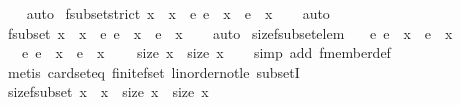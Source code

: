 \begin{isabellebody}
%
\isadelimproof
\ \ %
\endisadelimproof
%
\isatagproof
{}\isamarkupfalse%
\ auto%
\endisatagproof
{\isafoldproof}%
%
\isadelimproof
\isanewline
%
\endisadelimproof
\isanewline
{}\isamarkupfalse%
\ fsubset{\isacharunderscore}strict{\isacharcolon}\ {\isachardoublequoteopen}x{}\ {\isacharbar}{\isasymsubset}{\isacharbar}\ x{}\ {\isasymLongrightarrow}\ {\isasymexists}e{\isachardot}\ e\ {\isacharbar}{\isasymin}{\isacharbar}\ x{}\ {\isasymand}\ e\ {\isacharbar}{\isasymnotin}{\isacharbar}\ x{}{\isachardoublequoteclose}\isanewline
%
\isadelimproof
\ \ %
\endisadelimproof
%
\isatagproof
{}\isamarkupfalse%
\ auto%
\endisatagproof
{\isafoldproof}%
%
\isadelimproof
\isanewline
%
\endisadelimproof
\isanewline
{}\isamarkupfalse%
\ fsubset{\isacharcolon}\ {\isachardoublequoteopen}x{}\ {\isacharbar}{\isasymsubset}{\isacharbar}\ x{}\ {\isasymLongrightarrow}\ {\isasymnexists}e{\isachardot}\ e\ {\isacharbar}{\isasymin}{\isacharbar}\ x{}\ {\isasymand}\ e\ {\isacharbar}{\isasymnotin}{\isacharbar}\ x{}{\isachardoublequoteclose}\isanewline
%
\isadelimproof
\ \ %
\endisadelimproof
%
\isatagproof
{}\isamarkupfalse%
\ auto%
\endisatagproof
{\isafoldproof}%
%
\isadelimproof
\isanewline
%
\endisadelimproof
\isanewline
{}\isamarkupfalse%
\ size{\isacharunderscore}fsubset{\isacharunderscore}elem{\isacharcolon}\ \isanewline
\ \ {\isachardoublequoteopen}{\isasymexists}e{\isachardot}\ e\ {\isacharbar}{\isasymin}{\isacharbar}\ x{}\ {\isasymand}\ e\ {\isacharbar}{\isasymnotin}{\isacharbar}\ x{}\ {\isasymLongrightarrow}\isanewline
\ \ \ {\isasymnexists}e{\isachardot}\ e\ {\isacharbar}{\isasymin}{\isacharbar}\ x{}\ {\isasymand}\ e\ {\isacharbar}{\isasymnotin}{\isacharbar}\ x{}\ {\isasymLongrightarrow}\isanewline
\ \ \ size\ x{}\ {\isacharless}\ size\ x{}{\isachardoublequoteclose}\isanewline
%
\isadelimproof
\ \ %
\endisadelimproof
%
\isatagproof
{}\isamarkupfalse%
\ {\isacharparenleft}simp\ add{\isacharcolon}\ fmember{\isacharunderscore}def{\isacharparenright}\isanewline
\ \ \isamarkupfalse%
\ {\isacharparenleft}metis\ card{\isacharunderscore}seteq\ finite{\isacharunderscore}fset\ linorder{\isacharunderscore}not{\isacharunderscore}le\ subsetI{\isacharparenright}%
\endisatagproof
{\isafoldproof}%
%
\isadelimproof
\isanewline
%
\endisadelimproof
\isanewline
{}\isamarkupfalse%
\ size{\isacharunderscore}fsubset{\isacharcolon}\ {\isachardoublequoteopen}x{}\ {\isacharbar}{\isasymsubset}{\isacharbar}\ x{}\ {\isasymLongrightarrow}\ size\ x{}\ {\isacharless}\ size\ x{}{\isachardoublequoteclose}\isanewline

\end{isabellebody}
